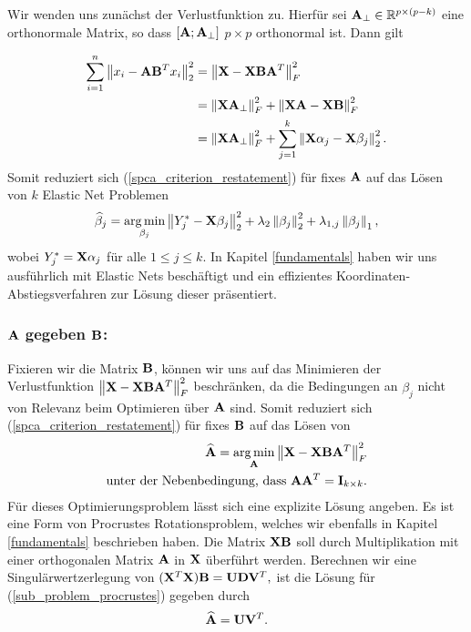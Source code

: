 Wir wenden uns zunächst der Verlustfunktion zu. Hierfür sei $\mathbf{A}_{\perp} \in \mathbb{R}^{p \times (p-k)}$ eine orthonormale Matrix, so dass $[\mathbf{A} ; \mathbf{A}_{\perp}]$ $p \times p$ orthonormal ist. Dann gilt

\begin{align*}
\sum_{i=1}^{n} \left\lVert x_i - \mathbf{A}\mathbf{B}^Tx_i \right\rVert_2^2 & = \left\lVert \mathbf{X} - \mathbf{X} \mathbf{B} \mathbf{A}^T \right\rVert_F^{2}\\
& = \left\lVert \mathbf{X} \mathbf{A}_{\perp} \right\rVert_F^2 + \left\lVert \mathbf{X} \mathbf{A} - \mathbf{X} \mathbf{B} \right\rVert_F^2\\
& = \left\lVert \mathbf{X} \mathbf{A}_{\perp} \right\rVert_F^2 + \sum_{j=1}^{k}\left\lVert \mathbf{X} \alpha_j - \mathbf{X}\beta_j \right\rVert_2^2.
\end{align*}
Somit reduziert sich (\ref{spca_criterion_restatement}) für fixes $\mathbf{A}$ auf das Lösen von $k$ Elastic Net Problemen
\begin{align}
\label{sub_problem_enet}
\widehat{\beta}_j = \operatorname*{arg\,min}_{\beta_j} \left\lVert Y_j^* - \mathbf{X} \beta_j \right\rVert_2^2 + \lambda_2 \left\lVert \beta_j \right\rVert_2^2 + \lambda_{1,j}\left\lVert \beta_j \right\rVert_1,
\end{align}
wobei $Y_j^* = \mathbf{X} \alpha_j$ für alle $1 \leq j \leq k$. In Kapitel \ref{fundamentals} haben wir uns ausführlich mit Elastic Nets beschäftigt und ein effizientes Koordinaten-Abstiegsverfahren zur Lösung dieser präsentiert.

\subsubsection{$\mathbf{A}$ gegeben $\mathbf{B}$:}

Fixieren wir die Matrix $\mathbf{B}$, können wir uns auf das Minimieren der Verlustfunktion $\left\lVert \mathbf{X} - \mathbf{X} \mathbf{B} \mathbf{A}^T \right\rVert_F^{2}$ beschränken, da die Bedingungen an $\beta_j$ nicht von Relevanz beim Optimieren über $\mathbf{A}$ sind. Somit reduziert sich (\ref{spca_criterion_restatement}) für fixes $\mathbf{B}$ auf das Lösen von
\begin{align}
\label{sub_problem_procrustes}
\begin{split}
\widehat{\mathbf{A}} = \operatorname*{arg\,min}_{\mathbf{A}}\left\lVert \mathbf{X} - \mathbf{X} \mathbf{B} \mathbf{A}^T \right\rVert_F^2\\
\text{unter der Nebenbedingung, dass } \mathbf{A} \mathbf{A}^T = \mathbf{I}_{k \times k}.
\end{split}
\end{align}
Für dieses Optimierungsproblem lässt sich eine explizite Lösung angeben. Es ist eine Form von Procrustes Rotationsproblem, welches wir ebenfalls in Kapitel \ref{fundamentals} beschrieben haben. Die Matrix $\mathbf{X} \mathbf{B}$ soll durch Multiplikation mit einer orthogonalen Matrix $\mathbf{A}$ in $\mathbf{X}$ überführt werden. Berechnen wir eine Singulärwertzerlegung von $(\mathbf{X}^T \mathbf{X}) \mathbf{B} = \mathbf{U} \mathbf{D} \mathbf{V}^T,$ ist die Lösung für (\ref{sub_problem_procrustes}) gegeben durch
\begin{align}
\widehat{\mathbf{A}} = \mathbf{U} \mathbf{V}^T.
\end{align}


